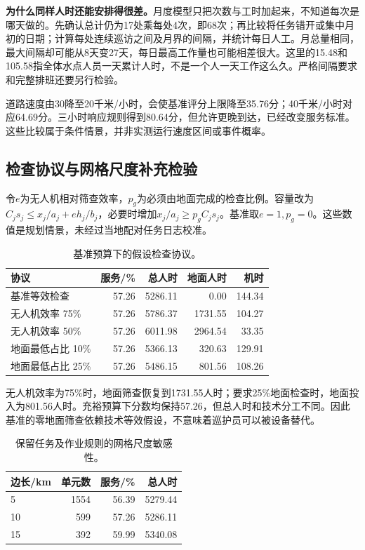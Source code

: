 \documentclass[12pt,a4paper]{article}
\numberwithin{equation}{section}
\begin{document}
\noindent\textbf{为什么同样人时还能安排得很差。}月度模型只把次数与工时加起来，不知道每次是哪天做的。先确认总计仍为17处乘每处4次，即68次；再比较将任务错开或集中月初的日期；计算每处连续巡访之间及月界的间隔，并统计每日人工。月总量相同，最大间隔却可能从8天变27天，每日最高工作量也可能相差很大。这里的15.48和105.58指全体水点人员一天累计人时，不是一个人一天工作这么久。严格间隔要求和完整排班还要另行检验。


道路速度由30降至20千米/小时，会使基准评分上限降至35.76分；40千米/小时对应64.69分。三小时响应规则得到80.64分，但允许更晚到达，已经改变服务标准。这些比较属于条件情景，并非实测运行速度区间或事件概率。
\clearpage

\subsection{检查协议与网格尺度补充检验}
令$e$为无人机相对筛查效率，$p_g$为必须由地面完成的检查比例。容量改为$C_js_j\le x_j/a_j+e h_j/b_j$，必要时增加$x_j/a_j\ge p_gC_js_j$。基准取$e=1,p_g=0$。这些数值是规划情景，未经过当地配对任务日志校准。

\begin{table}[!htbp]
\centering\normalsize
\caption{基准预算下的假设检查协议。}
\label{tab:protocol}
\begin{tabular}{lrrrr}
\toprule
协议 & 服务/\% & 总人时 & 地面人时 & 机时 \\
\midrule
基准等效检查 & 57.26 & 5286.11 & 0.00 & 144.34 \\
无人机效率 75\% & 57.26 & 5786.37 & 1731.55 & 104.27 \\
无人机效率 50\% & 57.26 & 6011.98 & 2964.54 & 33.35 \\
地面最低占比 10\% & 57.26 & 5366.13 & 320.63 & 129.91 \\
地面最低占比 25\% & 57.26 & 5486.15 & 801.56 & 108.26 \\
\bottomrule
\end{tabular}
\end{table}

无人机效率为75\%时，地面筛查恢复到1731.55人时；要求25\%地面检查时，地面投入为801.56人时。充裕预算下分数均保持57.26，但总人时和技术分工不同。因此基准的零地面筛查依赖技术等效假设，不意味着巡护员可以被设备替代。

\begin{table}[!htbp]
\centering\normalsize
\caption{保留任务及作业规则的网格尺度敏感性。}
\label{tab:grid}
\begin{tabular}{lrrr}
\toprule
边长/km & 单元数 & 服务/\% & 总人时 \\
\midrule
5 & 1554 & 56.39 & 5279.44 \\
10 & 599 & 57.26 & 5286.11 \\
15 & 392 & 59.99 & 5340.08 \\
\bottomrule
\end{tabular}
\end{table}
\end{document}
